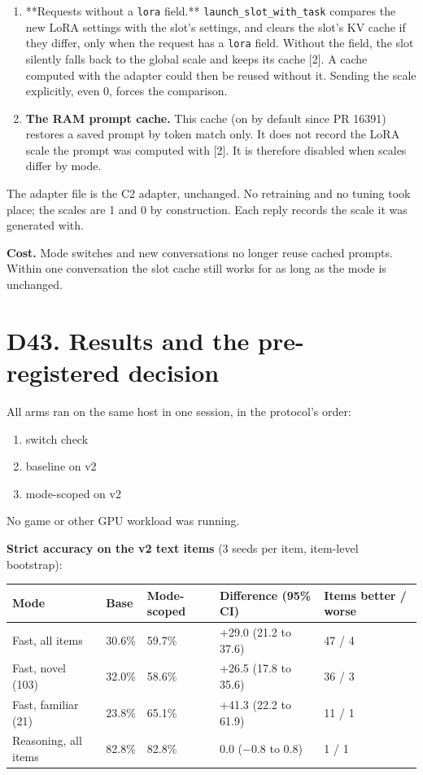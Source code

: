 \documentclass[11pt,a4paper]{article}
\newcommand{\code}[1]{\texttt{#1}}
\begin{document}
\begin{enumerate}
\item **Requests without a \code{lora} field.** \code{launch\_slot\_with\_task} compares the new LoRA settings with the slot's settings, and clears the slot's KV cache if they differ, only when the request has a \code{lora} field. Without the field, the slot silently falls back to the global scale and keeps its cache [2]. A cache computed with the adapter could then be reused without it. Sending the scale explicitly, even 0, forces the comparison.
\item \textbf{The RAM prompt cache.} This cache (on by default since PR 16391) restores a saved prompt by token match only. It does not record the LoRA scale the prompt was computed with [2]. It is therefore disabled when scales differ by mode.
\end{enumerate}

The adapter file is the C2 adapter, unchanged. No retraining and no tuning took place; the scales are 1 and 0 by construction. Each reply records the scale it was generated with.

\textbf{Cost.} Mode switches and new conversations no longer reuse cached prompts. Within one conversation the slot cache still works for as long as the mode is unchanged.

\section{D43. Results and the pre-registered decision}

All arms ran on the same host in one session, in the protocol's order:

\begin{enumerate}
\item switch check
\item baseline on v2
\item mode-scoped on v2
\end{enumerate}

No game or other GPU workload was running.

\textbf{Strict accuracy on the v2 text items} (3 seeds per item, item-level bootstrap):

\begin{table}[H]\centering\small
\begin{tabularx}{\textwidth}{@{}Yllll@{}}
\toprule
Mode & Base & Mode-scoped & Difference (95\% CI) & Items better / worse \\
\midrule
Fast, all items & 30.6\% & 59.7\% & +29.0 (21.2 to 37.6) & 47 / 4 \\
Fast, novel (103) & 32.0\% & 58.6\% & +26.5 (17.8 to 35.6) & 36 / 3 \\
Fast, familiar (21) & 23.8\% & 65.1\% & +41.3 (22.2 to 61.9) & 11 / 1 \\
Reasoning, all items & 82.8\% & 82.8\% & 0.0 ($-$0.8 to 0.8) & 1 / 1 \\
\bottomrule\end{tabularx}\end{table}
\end{document}
